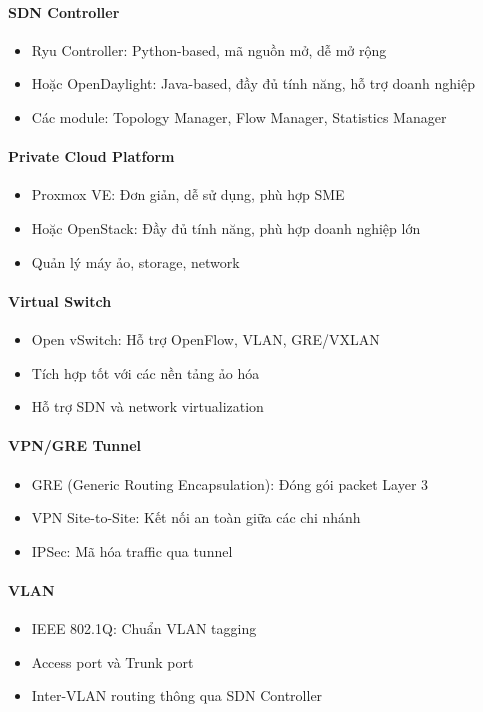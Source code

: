\paragraph{SDN Controller}
\begin{itemize}
    \item Ryu Controller: Python-based, mã nguồn mở, dễ mở rộng
    \item Hoặc OpenDaylight: Java-based, đầy đủ tính năng, hỗ trợ doanh nghiệp
    \item Các module: Topology Manager, Flow Manager, Statistics Manager
\end{itemize}

\paragraph{Private Cloud Platform}
\begin{itemize}
    \item Proxmox VE: Đơn giản, dễ sử dụng, phù hợp SME
    \item Hoặc OpenStack: Đầy đủ tính năng, phù hợp doanh nghiệp lớn
    \item Quản lý máy ảo, storage, network
\end{itemize}

\paragraph{Virtual Switch}
\begin{itemize}
    \item Open vSwitch: Hỗ trợ OpenFlow, VLAN, GRE/VXLAN
    \item Tích hợp tốt với các nền tảng ảo hóa
    \item Hỗ trợ SDN và network virtualization
\end{itemize}

\paragraph{VPN/GRE Tunnel}
\begin{itemize}
    \item GRE (Generic Routing Encapsulation): Đóng gói packet Layer 3
    \item VPN Site-to-Site: Kết nối an toàn giữa các chi nhánh
    \item IPSec: Mã hóa traffic qua tunnel
\end{itemize}

\paragraph{VLAN}
\begin{itemize}
    \item IEEE 802.1Q: Chuẩn VLAN tagging
    \item Access port và Trunk port
    \item Inter-VLAN routing thông qua SDN Controller
\end{itemize}

